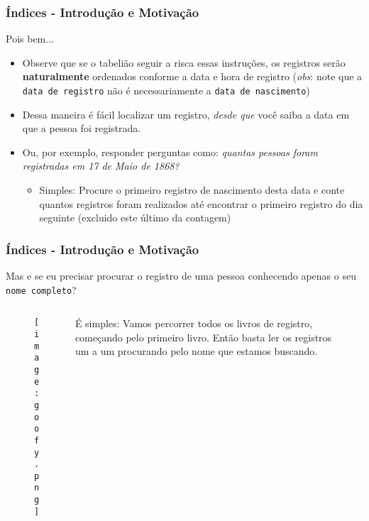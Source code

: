 \documentclass[t, 10pt, aspectratio=169, table, x11names]{beamer}
\begin{document}
	\begin{frame}
		\frametitle{Índices - Introdução e Motivação}

		Pois bem...
		
		\begin{itemize}
			\item Observe que se o tabelião seguir a risca essas instruções, os registros serão \textbf{naturalmente} ordenados conforme a data e hora de registro (\textit{obs}: note que a \texttt{data de registro} não é necessariamente a \texttt{data de nascimento})
			\bigskip
			\item Dessa maneira é fácil localizar um registro, \textit{desde que} você saiba a data em que a pessoa foi registrada.
			\bigskip
			\item Ou, por exemplo, responder perguntas como: \textit{quantas pessoas foram registradas em 17 de Maio de 1868?}
			\begin{itemize}
				\item Simples: Procure o primeiro registro de nascimento desta data e conte quantos registros foram realizados até encontrar o primeiro registro do dia seguinte (excluido este último da contagem)
			\end{itemize}
			
		\end{itemize}
	\end{frame}

	\begin{frame}
		\frametitle{Índices - Introdução e Motivação}
		Mas e se eu precisar procurar o registro de uma pessoa conhecendo apenas o seu \texttt{nome completo}?
		\bigskip
		\begin{columns}[t]
			\begin{column}{0.40\textwidth}
				\begin{figure}[h]
					\texttt{[image: goofy.png]}
				\end{figure}
			\end{column}
			\begin{column}{0.50\textwidth}
				\bigskip
				
				É simples: Vamos percorrer todos os livros de registro, começando pelo primeiro livro. Então basta ler os registros um a um procurando pelo nome que estamos buscando.
			\end{column}
			\begin{column}{0.05\textwidth}
			\end{column}
		\end{columns}
	\end{frame}
\end{document}
